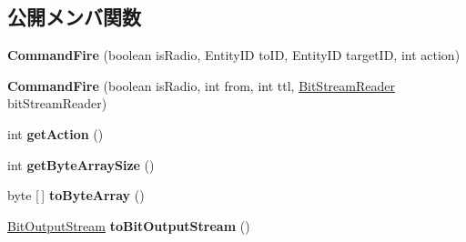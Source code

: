 \subsection*{公開メンバ関数}
\begin{DoxyCompactItemize}
\item 
\hypertarget{classadf_1_1agent_1_1communication_1_1standard_1_1bundle_1_1topdown_1_1CommandFire_a096f6d1f59e59d3e50d4aaa81627ffe5}{}\label{classadf_1_1agent_1_1communication_1_1standard_1_1bundle_1_1topdown_1_1CommandFire_a096f6d1f59e59d3e50d4aaa81627ffe5} 
{\bfseries Command\+Fire} (boolean is\+Radio, Entity\+ID to\+ID, Entity\+ID target\+ID, int action)
\item 
\hypertarget{classadf_1_1agent_1_1communication_1_1standard_1_1bundle_1_1topdown_1_1CommandFire_a7a3979249cfbe7491fcb6a25ba3b7260}{}\label{classadf_1_1agent_1_1communication_1_1standard_1_1bundle_1_1topdown_1_1CommandFire_a7a3979249cfbe7491fcb6a25ba3b7260} 
{\bfseries Command\+Fire} (boolean is\+Radio, int from, int ttl, \hyperlink{classadf_1_1component_1_1communication_1_1util_1_1BitStreamReader}{Bit\+Stream\+Reader} bit\+Stream\+Reader)
\item 
\hypertarget{classadf_1_1agent_1_1communication_1_1standard_1_1bundle_1_1topdown_1_1CommandFire_ac5b6f3774aba7df932872d62aa5a4562}{}\label{classadf_1_1agent_1_1communication_1_1standard_1_1bundle_1_1topdown_1_1CommandFire_ac5b6f3774aba7df932872d62aa5a4562} 
int {\bfseries get\+Action} ()
\item 
\hypertarget{classadf_1_1agent_1_1communication_1_1standard_1_1bundle_1_1topdown_1_1CommandFire_a31d8677dededcf55229510bb013d4258}{}\label{classadf_1_1agent_1_1communication_1_1standard_1_1bundle_1_1topdown_1_1CommandFire_a31d8677dededcf55229510bb013d4258} 
int {\bfseries get\+Byte\+Array\+Size} ()
\item 
\hypertarget{classadf_1_1agent_1_1communication_1_1standard_1_1bundle_1_1topdown_1_1CommandFire_abbcfbbd10848d3ec6d5ed0ce3f6074c0}{}\label{classadf_1_1agent_1_1communication_1_1standard_1_1bundle_1_1topdown_1_1CommandFire_abbcfbbd10848d3ec6d5ed0ce3f6074c0} 
byte \mbox{[}$\,$\mbox{]} {\bfseries to\+Byte\+Array} ()
\item 
\hypertarget{classadf_1_1agent_1_1communication_1_1standard_1_1bundle_1_1topdown_1_1CommandFire_a4e69239f9f8c5c6ad6b381ac5eff2ded}{}\label{classadf_1_1agent_1_1communication_1_1standard_1_1bundle_1_1topdown_1_1CommandFire_a4e69239f9f8c5c6ad6b381ac5eff2ded} 
\hyperlink{classadf_1_1component_1_1communication_1_1util_1_1BitOutputStream}{Bit\+Output\+Stream} {\bfseries to\+Bit\+Output\+Stream} ()

\end{DoxyCompactItemize}
